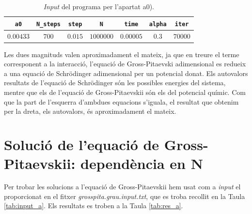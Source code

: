 \documentclass[a4paper]{article}
\begin{document}
\begin{table}[H]
    \centering
    \begin{tabular}{|c|c|c|c|c|c|c|}
    \hline
    \rowcolor[HTML]{EFEFEF}
       \textbf{\texttt{a0}} & \textbf{\texttt{N\_steps}} & \textbf{\texttt{step}} &\textbf{\texttt{N}} & \textbf{\texttt{time}} & \textbf{\texttt{alpha}} & \textbf{\texttt{iter}} \\ \hline\hline
       $0.00433$ & $700$ & $0.015$ & $1000000$ & $0.00005$ & $0.3$ & $70000$ \\ \hline
    \end{tabular}
\caption{\textit{Input} del programa per l'apartat a0).}
\label{tab:input_a0}
\end{table}

Les dues magnituds valen aproximadament el mateix, ja que en treure el terme corresponent a la interacció, l'equació de Gross-Pitaevski adimensional es redueix a una equació de Schrödinger adimensional per un potencial donat. Els autovalors resultats de l'equació de Schrödinger són les possibles energies del sistema, mentre que els de l'equació de Gross-Pitaevskii són els del potencial químic. Com que la part de l'esquerra d'ambdues equacions s'iguala, el resultat que obtenim per la dreta, els autovalors, és aproximadament el mateix.



\section{\bf Solució de l'equació de Gross-Pitaevskii: dependència en $\boldsymbol{N}$}


Per trobar les solucions a l'equació de Gross-Pitaevskii hem usat com a \textit{input} el proporcionat en el fitxer \textit{grosspita.grau.input.txt}, que es troba recollit en la Taula \ref{tab:input_a}. Els resultats es troben a la Taula \ref{tab:res_a}.
\end{document}
